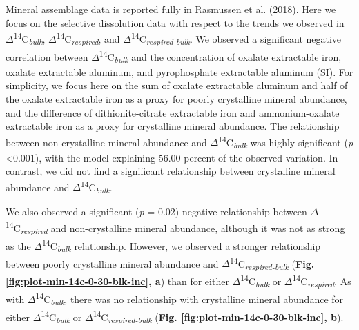 \documentclass[english,man,floatsintext]{apa6}
\begin{document}
Mineral assemblage data is reported fully in Rasmussen et al. (2018). Here we focus on the selective dissolution data with respect to the trends we observed in \(\Delta\)\textsuperscript{14}C\textsubscript{\emph{bulk}}, \(\Delta\)\textsuperscript{14}C\textsubscript{\emph{respired}}, and \(\Delta\)\textsuperscript{14}C\textsubscript{\emph{respired-bulk}}. We observed a significant negative correlation between \(\Delta\)\textsuperscript{14}C\textsubscript{\emph{bulk}} and the concentration of oxalate extractable iron, oxalate extractable aluminum, and pyrophosphate extractable aluminum (SI). For simplicity, we focus here on the sum of oxalate extractable aluminum and half of the oxalate extractable iron as a proxy for poorly crystalline mineral abundance, and the difference of dithionite-citrate extractable iron and ammonium-oxalate extractable iron as a proxy for crystalline mineral abundance. The relationship between non-crystalline mineral abundance and \(\Delta\)\textsuperscript{14}C\textsubscript{\emph{bulk}} was highly significant (\emph{p} \textless{}0.001), with the model explaining 56.00 percent of the observed variation. In contrast, we did not find a significant relationship between crystalline mineral abundance and \(\Delta\)\textsuperscript{14}C\textsubscript{\emph{bulk}}.

We also observed a significant (\emph{p} = 0.02) negative relationship between \(\Delta\)\textsuperscript{14}C\textsubscript{\emph{respired}} and non-crystalline mineral abundance, although it was not as strong as the \(\Delta\)\textsuperscript{14}C\textsubscript{\emph{bulk}} relationship. However, we observed a stronger relationship between poorly crystalline mineral abundance and \(\Delta\)\textsuperscript{14}C\textsubscript{\emph{respired-bulk}} (\textbf{Fig. \ref{fig:plot-min-14c-0-30-blk-inc}, a}) than for either \(\Delta\)\textsuperscript{14}C\textsubscript{\emph{bulk}} or \(\Delta\)\textsuperscript{14}C\textsubscript{\emph{respired}}. As with \(\Delta\)\textsuperscript{14}C\textsubscript{\emph{bulk}}, there was no relationship with crystalline mineral abundance for either \(\Delta\)\textsuperscript{14}C\textsubscript{\emph{bulk}} or \(\Delta\)\textsuperscript{14}C\textsubscript{\emph{respired-bulk}} (\textbf{Fig. \ref{fig:plot-min-14c-0-30-blk-inc}, b}).
\end{document}

